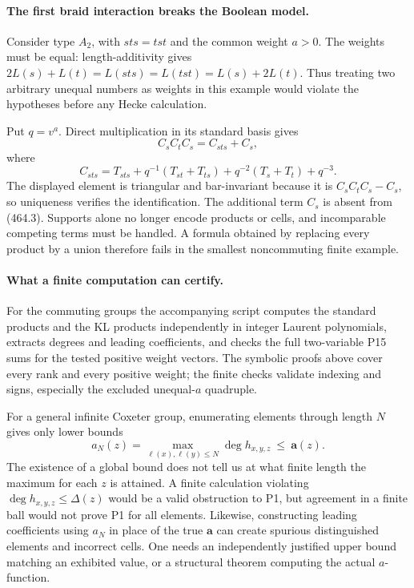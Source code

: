 \documentclass[11pt]{article}
\begin{document}
\paragraph{The first braid interaction breaks the Boolean model.}
Consider type $A_2$, with $sts=tst$ and the common weight $a>0$.
The weights must be equal: length-additivity gives
$2L(s)+L(t)=L(sts)=L(tst)=L(s)+2L(t)$.
Thus treating two arbitrary unequal numbers as weights in this
example would violate the hypotheses before any Hecke calculation.

Put $q=v^a$. Direct multiplication in its standard basis gives
\[
 C_sC_tC_s=C_{sts}+C_s,
\]
where
\[
 C_{sts}=T_{sts}+q^{-1}(T_{st}+T_{ts})
                 +q^{-2}(T_s+T_t)+q^{-3}.
\]
The displayed element is triangular and bar-invariant because it is
$C_sC_tC_s-C_s$, so uniqueness verifies the identification.
The additional term $C_s$ is absent from (464.3). Supports alone no
longer encode products or cells, and incomparable competing terms must
be handled. A formula obtained by replacing every product by a union
therefore fails in the smallest noncommuting finite example.

\paragraph{What a finite computation can certify.}
For the commuting groups the accompanying script computes the standard
products and the KL products independently in integer Laurent
polynomials, extracts degrees and leading coefficients, and checks
the full two-variable P15 sums for the tested positive weight vectors.
The symbolic proofs above cover every rank and every positive weight;
the finite checks validate indexing and signs, especially the excluded
unequal-$a$ quadruple.

For a general infinite Coxeter group, enumerating elements through
length $N$ gives only lower bounds
\[
 a_N(z)=\max_{\ell(x),\ell(y)\leq N}\deg h_{x,y,z}
 \ \leq\ \mathbf a(z).
\]
The existence of a global bound does not tell us at what finite length
the maximum for each $z$ is attained. A finite calculation violating
$\deg h_{x,y,z}\leq\Delta(z)$ would be a valid obstruction to P1,
but agreement in a finite ball would not prove P1 for all elements.
Likewise, constructing leading coefficients using $a_N$ in place of
the true $\mathbf a$ can create spurious distinguished elements and
incorrect cells. One needs an independently justified upper bound
matching an exhibited value, or a structural theorem computing the
actual $a$-function.
\end{document}
